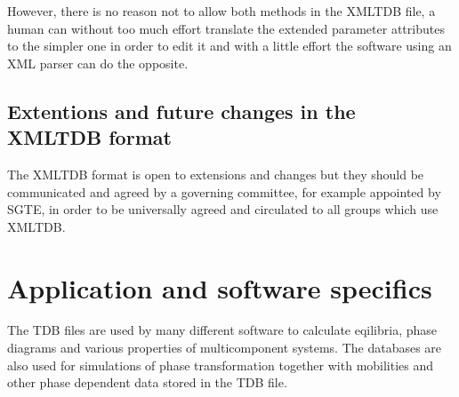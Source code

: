 \documentclass[12pt]{article}
\begin{document}
However, there is no reason not to allow both methods in the XMLTDB
file, a human can without too much effort translate the extended
parameter attributes to the simpler one in order to edit it and with a
little effort the software using an XML parser can do the opposite.

\subsection{Extentions and future changes in the XMLTDB format}

The XMLTDB format is open to extensions and changes but they should be
communicated and agreed by a governing committee, for example
appointed by SGTE, in order to be universally agreed and circulated to
all groups which use XMLTDB.


\section{Application and software specifics}

The TDB files are used by many different software to calculate
eqilibria, phase diagrams and various properties of multicomponent
systems.  The databases are also used for simulations of phase
transformation together with mobilities and other phase dependent data
stored in the TDB file.
\end{document}

